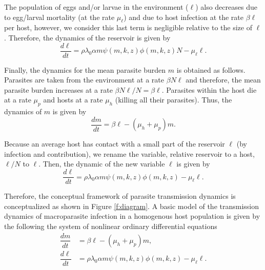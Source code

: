 \documentclass[eng]{MMSB-class-eng}
\begin{document}
{\color{red}
The population of eggs and/or larvae in the environment ($\ell$) also decreases due to egg/larval mortality (at the rate $\mu_{\ell}$) and due to host infection at the rate $\beta \ell$ per host, however, we consider this last term is negligible relative to the size of $\ell$. 
Therefore, the dynamics of the reservoir is given by
\begin{equation}\label{eqreservorioT}
\dfrac{d\ell}{dt}= \rho\lambda_0
\alpha m
\psi(m,k,z) \phi(m,k,z) N- \mu_{\ell} \ell.
\end{equation}

Finally, the dynamics for the mean parasite burden $m$ is obtained as follows. Parasites are taken from the environment at a rate $\beta N \ell $ and therefore, the mean parasite burden increases at a rate $\beta  N\ell/N=\beta\ell $. Parasites within the host die at a rate $\mu_p$ and hosts at a rate $\mu_h$ (killing all their parasites). Thus, the dynamics of $m$ is given by
\begin{equation}\label{eqm}
\dfrac{dm}{dt}=\beta \ell - (\mu_h+\mu_p)m.
\end{equation}



Because an average host has contact with a small part of the reservoir $\ell$ (by infection and contribution), we rename the  variable, relative reservoir to a host, $\ell/N$ to $\ell$.
Then, the dynamic of the new variable $\ell$ is given by 	
\begin{equation}\label{eqreservorio}
\dfrac{d\ell}{dt}= \rho\lambda_0
\alpha m
\psi(m,k,z) \phi(m,k,z) - \mu_{\ell} \ell.
\end{equation}
	
Therefore, the conceptual framework of parasite transmission dynamics is conceptualized as shown in Figure \ref{f:diagram}. A basic model of the transmission dynamics of macroparasite infection in a homogenous host population is given by the following the system of nonlinear ordinary differential equations
{\color{red} 
\begin{equation}\label{model1}
\begin{split}
\dfrac{dm}{dt}&=\beta \ell - (\mu_h+\mu_p)m,\\
\dfrac{d\ell}{dt}&= \rho\lambda_0
\alpha m
\psi(m,k,z) \phi(m,k,z) - \mu_{\ell} \ell .
\end{split}
\end{equation}
}

}
\end{document}
